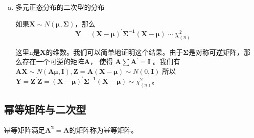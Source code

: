 \begin{enumerate}[ 1) ]
\begin{enumerate}[a)]
       			\item 多元正态分布的二次型的分布
       			
       			如果$ \boldsymbol{X} \sim  N(\boldsymbol{\mu, \Sigma}) $，那么
       			$$ \boldsymbol{ Y=(X-\mu)^{\prime} \Sigma^{-1}(X-\mu) } \sim \chi_{(n)}^{2} $$
       			
				   这里n是$ \boldsymbol{X} $的维数。我们可以简单地证明这个结果。由于$ \boldsymbol{\Sigma} $是对称可逆矩阵，那么存在一个可逆的矩阵$ \boldsymbol{A} $，
				   使得 $ \boldsymbol{ A \sum A^{\prime}=I }$ 。我们有 $ \boldsymbol{ A X }\sim N(\boldsymbol{A \mu, I}), \boldsymbol{Z=A(X-\mu)} 
				   \sim N(0, \boldsymbol{I}) $ 
				   所以 $ \boldsymbol{ Y=Z^{\prime} Z=(X-\mu)^{\prime} \Sigma^{-1}(X-\mu)} \sim \chi_{(n)}^{2} $。
       		\end{enumerate}
	\end{enumerate}

   \subsection{幂等矩阵与二次型}
   幂等矩阵满足$ \boldsymbol{A^2=A} $的矩阵称为幂等矩阵。
   
